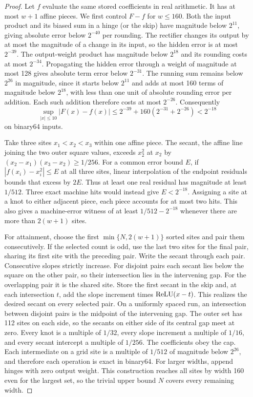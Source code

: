\begin{proof}
Let \(f\) evaluate the same stored coefficients in real arithmetic. It has at most \(w+1\) affine pieces. We first control \(F-f\) for \(w\le160\). Both the input product and its biased sum in a hinge (or the skip) have magnitude below \(2^{11}\), giving absolute error below \(2^{-40}\) per rounding. The rectifier changes its output by at most the magnitude of a change in its input, so the hidden error is at most \(2^{-39}\). The output-weight product has magnitude below \(2^{18}\) and its rounding costs at most \(2^{-34}\). Propagating the hidden error through a weight of magnitude at most 128 gives absolute term error below \(2^{-31}\). The running sum remains below \(2^{26}\) in magnitude, since it starts below \(2^{11}\) and adds at most 160 terms of magnitude below \(2^{18}\), with less than one unit of absolute rounding error per addition. Each such addition therefore costs at most \(2^{-26}\). Consequently
\[
             \sup_{|x|\le10}|F(x)-f(x)|
              \le 2^{-39}+160(2^{-31}+2^{-26})<2^{-18}
\]
on binary64 inputs.

Take three sites \(x_1<x_2<x_3\) within one affine piece. The secant, the affine line joining the two outer square values, exceeds \(x_2^2\) at \(x_2\) by \((x_2-x_1)(x_3-x_2)\ge1/256\). For a common error bound \(E\), if \(|f(x_i)-x_i^2|\le E\) at all three sites, linear interpolation of the endpoint residuals bounds that excess by \(2E\). Thus at least one real residual has magnitude at least \(1/512\). Three exact machine hits would instead give \(E<2^{-18}\). Assigning a site at a knot to either adjacent piece, each piece accounts for at most two hits. This also gives a machine-error witness of at least \(1/512-2^{-18}\) whenever there are more than \(2(w+1)\) sites.

For attainment, choose the first \(\min\{N,2(w+1)\}\) sorted sites and pair them consecutively. If the selected count is odd, use the last two sites for the final pair, sharing its first site with the preceding pair. Write the secant through each pair. Consecutive slopes strictly increase. For disjoint pairs each secant lies below the square on the other pair, so their intersection lies in the intervening gap. For the overlapping pair it is the shared site. Store the first secant in the skip and, at each intersection \(t\), add the slope increment times \(\operatorname{ReLU}(x-t)\). This realizes the desired secant on every selected pair. On a uniformly spaced run, an intersection between disjoint pairs is the midpoint of the intervening gap. The outer set has 112 sites on each side, so the secants on either side of its central gap meet at zero. Every knot is a multiple of \(1/32\), every slope increment a multiple of \(1/16\), and every secant intercept a multiple of \(1/256\). The coefficients obey the cap. Each intermediate on a grid site is a multiple of \(1/512\) of magnitude below \(2^{26}\), and therefore each operation is exact in binary64. For larger widths, append hinges with zero output weight. This construction reaches all sites by width 160 even for the largest set, so the trivial upper bound \(N\) covers every remaining width.
\end{proof}

